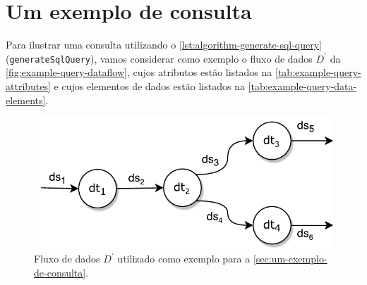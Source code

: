 \section{Um exemplo de consulta}%
\label{sec:um-exemplo-de-consulta}

Para ilustrar uma consulta utilizando o \autoref{lst:algorithm-generate-sql-query} (\texttt{generateSqlQuery}), vamos considerar como exemplo o fluxo de dados \(D^{\prime}\) da \autoref{fig:example-query-dataflow}, cujos atributos estão listados na \autoref{tab:example-query-attributes} e cujos elementos de dados estão listados na \autoref{tab:example-query-data-elements}.

\begin{figure}[!htb]
    \centering
    \includegraphics[width=\textwidth]{img/example-query-dataflow}
    \caption[Fluxo de dados de exemplo]{Fluxo de dados \(D^{\prime}\) utilizado como exemplo para a \autoref{sec:um-exemplo-de-consulta}.}%
    \label{fig:example-query-dataflow}
\end{figure}

